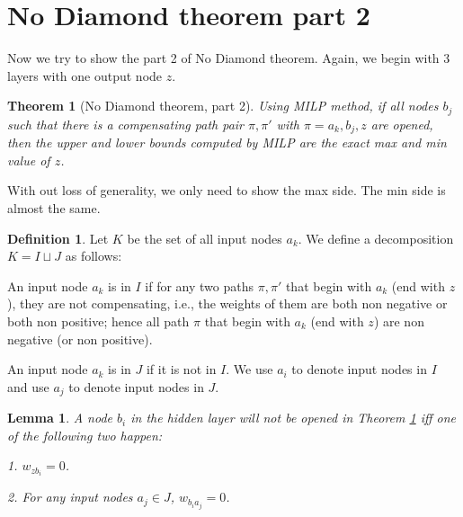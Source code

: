 \documentclass[]{article}
\newtheorem{theorem}{Theorem}
\newtheorem{lemma}{Lemma}
\theoremstyle{definition}
\newtheorem{definition}{Definition}
\begin{document}
	\section{No Diamond theorem part 2}

Now we try to show the part 2 of No Diamond theorem. Again, we begin with 3 layers with one output node $z$.

\begin{theorem}[No Diamond theorem, part 2] \label{no_diamond_2}
	Using MILP method, if all nodes $b_j$ such that there is a compensating path pair $\pi,\pi'$ with $\pi = a_k,b_j,z$ are opened, then the upper and lower bounds computed by MILP are the exact max and min value of $z$.
\end{theorem}

With out loss of generality, we only need to show the max side. The min side is almost the same.



\begin{definition}
	Let $K$ be the set of all input nodes $a_k$. We define a decomposition $K=I\sqcup J$ as follows:  
	
	An input node $a_k$ is in $I$ if for any two paths $\pi,\pi'$ that begin with $a_k$ (end with $z$), they are not compensating, i.e., the weights of them are both non negative or both non positive; hence all path $\pi$ that begin with $a_k$ (end with $z$) are non negative (or non positive).
	
	An input node $a_k$ is in $J$ if it is not in $I$. We use $a_i$ to denote input nodes in $I$ and use $a_j$ to denote input nodes in $J$.
\end{definition} 


\begin{lemma} \label{lem:open_node}
	A node $b_i$ in the hidden layer will not be opened in Theorem \ref{no_diamond_2} iff one of the following two happen:
	
	1. $w_{zb_i}=0$.
	
	2. For any input nodes $a_j\in J$, $w_{b_ia_j}=0$.
\end{lemma}
\end{document}

